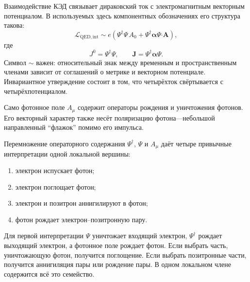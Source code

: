 Взаимодействие КЭД связывает дираковский ток с электромагнитным векторным потенциалом. В используемых здесь компонентных обозначениях его структура такова:
\begin{equation}
\mathcal L_{\mathrm{QED,int}}
\sim
e\left(
\Psi^\dagger\Psi\,A_0
+
\Psi^\dagger\boldsymbol{\alpha}\Psi\mathbin{\boldsymbol{\cdot}}\mathbf A
\right),
\end{equation}
где
\begin{equation}
J^0=\Psi^\dagger\Psi,
\qquad
\mathbf J=\Psi^\dagger\boldsymbol{\alpha}\Psi.
\end{equation}
Символ \(\sim\) важен: относительный знак между временным и пространственным членами зависит от соглашений о метрике и векторном потенциале. Инвариантное утверждение состоит в том, что четырёхток свёртывается с четырёхпотенциалом.

Само фотонное поле \(A_\mu\) содержит операторы рождения и уничтожения фотонов. Его векторный характер также несёт поляризацию фотона---небольшой направленный ``флажок'' помимо его импульса.

\begin{classroomqa}
\end{classroomqa}

Перемножение операторного содержания \(\Psi^\dagger\), \(\Psi\) и \(A_\mu\) даёт четыре привычные интерпретации одной локальной вершины:
\begin{enumerate}
\item электрон испускает фотон;
\item электрон поглощает фотон;
\item электрон и позитрон аннигилируют в фотон;
\item фотон рождает электрон--позитронную пару.
\end{enumerate}
Для первой интерпретации \(\Psi\) уничтожает входящий электрон, \(\Psi^\dagger\) рождает выходящий электрон, а фотонное поле рождает фотон. Если выбрать часть, уничтожающую фотон, получится поглощение. Если выбрать позитронные части, получится аннигиляция пары или рождение пары. В одном локальном члене содержится всё это семейство.

